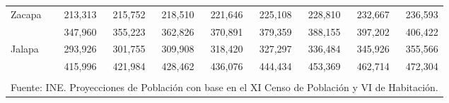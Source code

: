 {\begin{center}
\begin{tabular}{lrrrrrrrr}
			\multicolumn{1}{l}{Zacapa}	&	 213,313 	&	 215,752 	&	 218,510 	&	 221,646 	&	 225,108 	&	 228,810 	&	 232,667 	&	 236,593 	\\
			\rowcolor{color1!10!white} \multicolumn{1}{l}{Chiquimula}	&	 347,960 	&	 355,223 	&	 362,826 	&	 370,891 	&	 379,359 	&	 388,155 	&	 397,202 	&	 406,422 	\\
			\multicolumn{1}{l}{Jalapa}	&	 293,926 	&	 301,755 	&	 309,908 	&	 318,420 	&	 327,297 	&	 336,484 	&	 345,926 	&	 355,566 	\\
			\rowcolor{color1!10!white} \multicolumn{1}{l}{Jutiapa}	&	 415,996 	&	 421,984 	&	 428,462 	&	 436,076 	&	 444,434 	&	 453,369 	&	 462,714 	&	 472,304 	\\
			\hline
			&&&&&&&&\\[-0.28cm]
			\multicolumn{9}{l}{\footnotesize Fuente:  INE. Proyecciones de Población con base en el XI Censo de Población y VI de Habitación.}
		\end{tabular}\addtocounter{Cuadro}{1}
	\end{center}}


